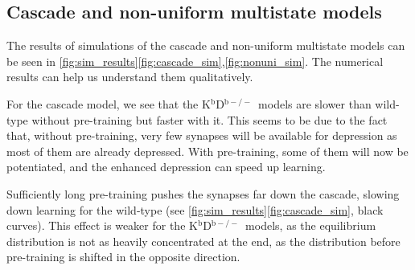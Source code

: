 \documentclass[10pt]{article}
\newcommand{\KO}{K$^\mathrm{b}$D$^{\mathrm{b}-/-}$}
\begin{document}


\subsection{Cascade and non-uniform multistate models}\label{sec:cascade}

%



The results of simulations of the cascade and non-uniform multistate models can be seen in
\autoref{fig:sim_results}\ref{fig:cascade_sim},\ref{fig:nonuni_sim}. %
The numerical results can help us understand them qualitatively.

For the cascade model, we see that the \KO\ models are slower than wild-type without pre-training but faster with it.
This seems to be due to the fact that, without pre-training, very few synapses will be available for depression as most of them are already depressed.
With pre-training, some of them will now be potentiated,
and the enhanced depression can speed up learning.

%

Sufficiently long pre-training pushes the synapses far down the cascade, slowing down learning for the wild-type (see \autoref{fig:sim_results}\ref{fig:cascade_sim}, black curves).
This effect is weaker for the \KO\ models, as the equilibrium distribution is not as heavily concentrated at the end, as the distribution before pre-training is shifted in the opposite direction.
\end{document}
